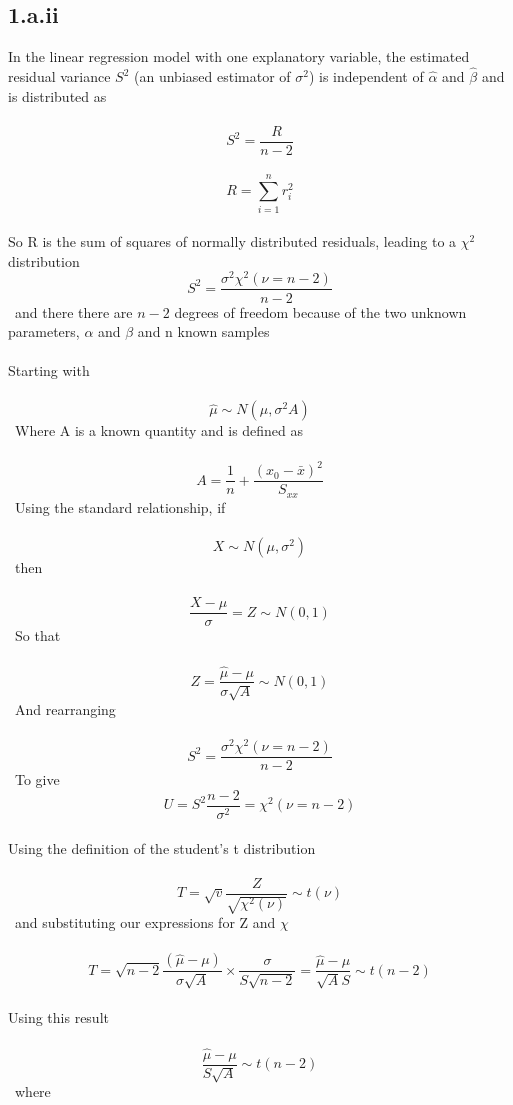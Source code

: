 \documentclass[11pt]{article}   	%
\begin{document}
\subsection*{1.a.ii}

In the linear regression model with one explanatory variable, the estimated residual variance $ S^2 $ (an unbiased estimator of $ \sigma^2 $) is independent of $ \hat{\alpha} $ and $ \hat{\beta} $ and is distributed as \\
\
\[ S^2 = \frac{ R } { n - 2 } \]
\
\[ R = \sum_{i = 1}^{n} r_i^2 \]
\\
So R is the sum of squares of normally distributed residuals, leading to a $ \chi^2 $ distribution \
\\
\[ S^2 = \frac{ \sigma^2 \chi^2( \nu = n - 2 ) } { n - 2 } \]
\
and there there are $ n - 2 $ degrees of freedom because of the two unknown parameters, $ \alpha $ and $ \beta $ and n known samples \\
\\
Starting with \\
\
\[ \hat{\mu} \sim N(\mu, \sigma^2 A) \]
\
Where A is a known quantity and is defined as \\
\
\[ A = \frac{1}{n} + \frac{ (x_0 - \bar{x})^2 } { S_{xx} } \]
\
Using the standard relationship, if \\
\
\[ X \sim N(\mu, \sigma^2) \]
\
then \\
\
\[ \frac{ X - \mu } { \sigma } = Z \sim N(0, 1) \]
\
So that \\
\
\[ Z = \frac{ \hat{\mu} - \mu } { \sigma \sqrt{A} } \sim N(0, 1) \]
\
And rearranging \\
\
\[ S^2 = \frac{ \sigma^2 \chi^2( \nu = n - 2 ) } { n - 2 } \]
\
To give \
\
\[ U = S^2 \frac{ n - 2 }{ \sigma^2 } = \chi^2( \nu = n - 2 ) \]
\\
Using the definition of the student's t distribution \\
\
\[ T = \sqrt{v} \frac { Z } { \sqrt{\chi^2( \nu ) } } \sim t( \nu ) \]
\
and substituting our expressions for Z and $ \chi $ \\
\\
\[ T = \sqrt{ n - 2 } \frac { ( \hat{\mu} - \mu ) } { \sigma \sqrt{A} } \times \frac{ \sigma } { S \sqrt{n - 2} } = \frac { \hat{\mu} - \mu } { \sqrt{A} S } \sim t(n-2) \]
\\
Using this result \\
\
\[ \frac { \hat{\mu} - \mu } { S \sqrt{A} } \sim t(n-2) \]
\
where \\
\\
\end{document}
